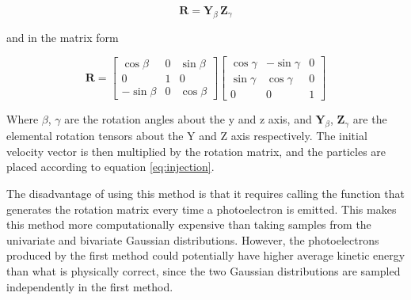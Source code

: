 \begin{equation}\label{eq:rotMat}
    \pmb{R} = \pmb{Y}_{\beta} \, \pmb{Z}_{\gamma}
\end{equation}


and in the matrix form


\begin{equation}\label{eq:rotMatFull}
    \pmb{R} = 
        \begin{bmatrix}
            \cos \beta & 0 & \sin \beta \\
            0 & 1 & 0 \\
            -\sin \beta & 0 & \cos \beta
        \end{bmatrix}
        \begin{bmatrix}
            \cos \gamma & -\sin \gamma & 0 \\
            \sin \gamma & \cos \gamma & 0 \\
            0 & 0 & 1
        \end{bmatrix}
\end{equation}

Where $\beta$, $\gamma$ are the rotation angles about the y and z axis, and $\pmb{Y}_{\beta}$, $\pmb{Z}_{\gamma}$ are the elemental rotation tensors about the Y and Z axis respectively. The initial velocity vector is then multiplied by the rotation matrix, and the particles are placed according to equation \eqref{eq:injection}.

The disadvantage of using this method is that it requires calling the function that generates the rotation matrix every time a photoelectron is emitted. This makes this method more computationally expensive than taking samples from the univariate and bivariate Gaussian distributions. However, the photoelectrons produced by the first method could potentially have higher average kinetic energy than what is physically correct, since the two Gaussian distributions are sampled independently in the first method.


